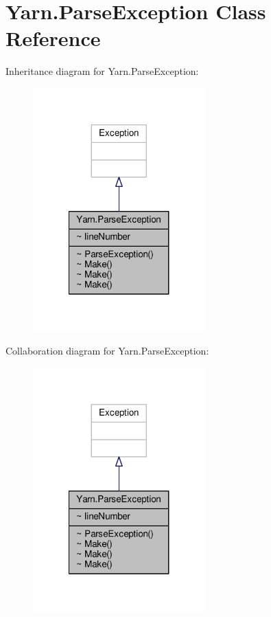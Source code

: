 \hypertarget{a00141}{\section{Yarn.\-Parse\-Exception Class Reference}
\label{a00141}
}


Inheritance diagram for Yarn.\-Parse\-Exception\-:
\nopagebreak
\begin{figure}[H]
\begin{center}
\leavevmode
\includegraphics[width=188pt]{a00700}
\end{center}
\end{figure}


Collaboration diagram for Yarn.\-Parse\-Exception\-:
\nopagebreak
\begin{figure}[H]
\begin{center}
\leavevmode
\includegraphics[width=188pt]{a00701}
\end{center}
\end{figure}
